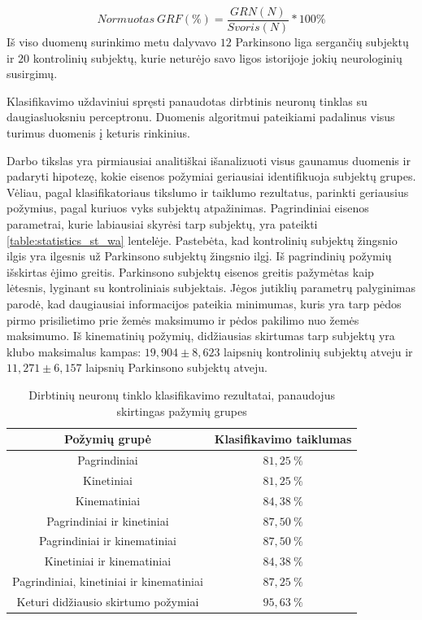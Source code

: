 \documentclass[]{vgtuef}
\begin{document}
\begin{equation}
Normuotas~GRF(\%) = \frac{GRN(N)}{Svoris (N)} * 100\%
\end{equation}
Iš viso duomenų surinkimo metu dalyvavo $12$ Parkinsono liga sergančių subjektų ir $20$ kontrolinių subjektų, kurie neturėjo savo ligos istorijoje jokių neurologinių susirgimų.

Klasifikavimo uždaviniui spręsti panaudotas dirbtinis neuronų tinklas su daugiasluoksniu perceptronu. Duomenis algoritmui pateikiami padalinus visus turimus duomenis į keturis rinkinius.

Darbo tikslas yra pirmiausiai analitiškai išanalizuoti visus gaunamus duomenis ir padaryti hipotezę, kokie eisenos požymiai geriausiai identifikuoja subjektų grupes. Vėliau, pagal klasifikatoriaus tikslumo ir taiklumo rezultatus, parinkti geriausius požymius, pagal kuriuos vyks subjektų atpažinimas. Pagrindiniai eisenos parametrai, kurie labiausiai skyrėsi tarp subjektų, yra pateikti \ref{table:statistics_st_wa} lentelėje. Pastebėta, kad kontrolinių subjektų žingsnio ilgis yra ilgesnis už Parkinsono subjektų žingsnio ilgį. Iš pagrindinių požymių išskirtas ėjimo greitis. Parkinsono subjektų eisenos greitis pažymėtas kaip lėtesnis, lyginant su kontroliniais subjektais. Jėgos jutiklių parametrų palyginimas parodė, kad daugiausiai informacijos pateikia minimumas, kuris yra tarp pėdos pirmo prisilietimo prie žemės maksimumo ir pėdos pakilimo nuo žemės maksimumo. Iš kinematinių požymių, didžiausias skirtumas tarp subjektų yra klubo maksimalus kampas: $19,904\pm8,623$ laipsnių kontrolinių subjektų atveju ir $11,271\pm6,157$ laipsnių Parkinsono subjektų atveju.

\begin{table}
	\centering
	\renewcommand{\arraystretch}{1.3}
	\caption{Dirbtinių neuronų tinklo klasifikavimo rezultatai, panaudojus skirtingas pažymių grupes \cite{6151536}}
	\label{table:ann_table_results}
	\begin{tabular}{|c|c|} \hline
		Požymių grupė & Klasifikavimo taiklumas \\ \hline
		Pagrindiniai & $81,25~\%$ \\ \hline
		Kinetiniai & $81,25~\%$ \\ \hline
		Kinematiniai & $84,38~\%$ \\ \hline
		Pagrindiniai ir kinetiniai & $87,50~\%$ \\ \hline
		Pagrindiniai ir kinematiniai & $87,50~\%$ \\ \hline
		Kinetiniai ir kinematiniai & $84,38~\%$ \\ \hline
		Pagrindiniai, kinetiniai ir kinematiniai & $87,25~\%$ \\ \hline	
		Keturi didžiausio skirtumo požymiai & $95,63~\%$ \\ \hline	
	\end{tabular}
\end{table}
\end{document}
